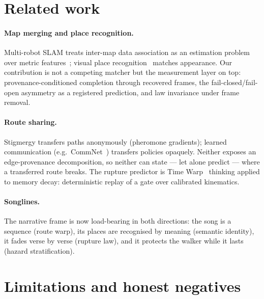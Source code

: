 \documentclass{article}
\begin{document}
\section{Related work}
\label{sec:related}

\paragraph{Map merging and place recognition.} Multi-robot SLAM
treats inter-map data association as an estimation problem over
metric features~\cite{cadena2016slam}; visual place
recognition~\cite{lowry2016vpr} matches appearance. Our contribution
is not a competing matcher but the measurement layer on top:
provenance-conditioned completion through recovered frames, the
fail-closed/fail-open asymmetry as a registered prediction, and law
invariance under frame removal.
\paragraph{Route sharing.} Stigmergy transfers paths anonymously
(pheromone gradients); learned communication (e.g.\
CommNet~\cite{sukhbaatar2016commnet}) transfers policies opaquely.
Neither exposes an edge-provenance decomposition, so neither can
state --- let alone predict --- where a transferred route breaks.
The rupture predictor is Time Warp~\cite{jefferson1985} thinking
applied to memory decay: deterministic replay of a gate over
calibrated kinematics.
\paragraph{Songlines.} The narrative frame is now load-bearing in
both directions: the song is a sequence (route warp), its places are
recognised by meaning (semantic identity), it fades verse by verse
(rupture law), and it protects the walker while it lasts (hazard
stratification). %

\section{Limitations and honest negatives}
\label{sec:limits}
\end{document}
